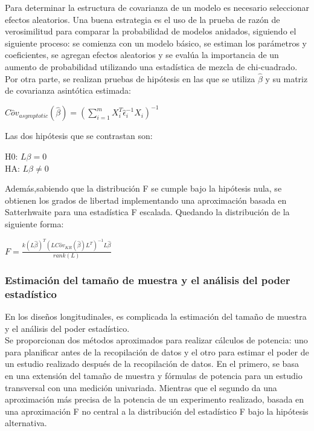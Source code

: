 \documentclass[12pt]{article}
\begin{document}
Para determinar la estructura de covarianza de un modelo es necesario seleccionar efectos aleatorios. Una buena estrategia es el uso de la prueba de razón de verosimilitud para comparar la probabilidad de modelos anidados, siguiendo el siguiente proceso: se comienza con un modelo básico, se estiman los parámetros y coeficientes, se agregan efectos aleatorios y se evalúa la importancia de un aumento de probabilidad utilizando una estadística de mezcla de chi-cuadrado.\\

Por otra parte, se realizan pruebas de hipótesis en las que se utiliza $\hat{\beta}$ y su matriz de covarianza asintótica estimada:
\begin{center}
	$C \hat{o} v_{asymptotic}(\hat{\beta})=(\sum_{i=1}^{m}X_{i}^{T} \hat{\epsilon}_{i}^{-1}X_{i})^{-1}$
\end{center}

Las dos hipótesis que se contrastan son:
\begin{center}
	H0: $L \beta = 0$\\HA: $L \beta \neq 0$
\end{center}
Además,sabiendo que la distribución F se cumple bajo la hipótesis nula, se obtienen los grados de libertad implementando una aproximación basada en Satterhwaite para una estadística F escalada. Quedando la distribución de la siguiente forma:
\begin{center}
	$F=\frac{\mathit{k}(L\hat{\beta})^{T}(LC\hat{o}v_{KR}(\hat{\beta})L^{T})^{-1}L\hat{\beta}}{rank(L)}$
\end{center}



\subsubsection{Estimación del tamaño de muestra y el análisis del poder estadístico}

En los diseños longitudinales, es complicada la estimación del tamaño de muestra y el análisis del poder estadístico. \\

Se proporcionan dos métodos aproximados para realizar cálculos de potencia: uno para planificar antes de la recopilación de datos y el otro para estimar el poder de un estudio realizado después de la recopilación de datos. En el primero, se basa en una extensión del tamaño de muestra y fórmulas de potencia para un estudio transversal con una medición univariada. Mientras que el segundo da una aproximación más precisa de la potencia de un experimento realizado, basada en una aproximación F no central a la distribución del estadístico F bajo la hipótesis alternativa. 
\end{document}
